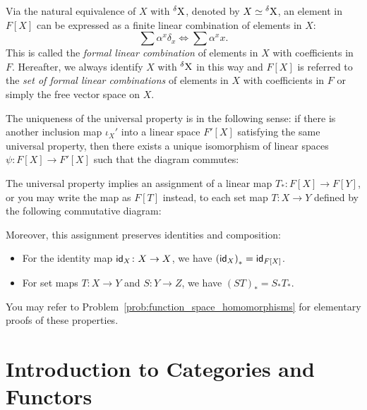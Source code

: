 Via the natural equivalence of $X$ with $\operatorname{{}^{\delta} X}$, denoted by $X \simeq \operatorname{{}^{\delta} X}$, an element in $F[X]$ can be expressed as a finite linear combination of elements in $X$:
\[
  \sum \alpha^x \delta_x \Longleftrightarrow \sum \alpha^x x.
\]
This is called the \emph{formal linear combination} of elements in $X$ with coefficients in $F$. Hereafter, we always identify $X$ with $\operatorname{{}^{\delta} X}$ in this way and $F[X]$ is referred to the \emph{set of formal linear combinations} of elements in $X$ with coefficients in $F$ or simply the free vector space on $X$.

The uniqueness of the universal property is in the following sense: if there is another inclusion map $\iota_X'$ into a linear space $F'[X]$ satisfying the same universal property, then there exists a unique isomorphism of linear spaces $\psi \colon F[X] \to F'[X]$ such that the diagram commutes:
\begin{center}
\end{center}

The universal property implies an assignment of a linear map $T_* \colon F[X] \to F[Y]$, or you may write the map as $F[T]$ instead, to each set map $T \colon X \to Y$ defined by the following commutative diagram:
\begin{center}
\end{center}
Moreover, this assignment preserves identities and composition:
\begin{itemize}
  \item For the identity map $\operatorname{\text{\normalfont\sffamily id}}_X \colon X \to X$, we have ${(\operatorname{\text{\normalfont\sffamily id}}_X)}_* = \operatorname{\text{\normalfont\sffamily id}}_{F[X]}$.
  \item For set maps $T \colon X \to Y$ and $S \colon Y \to Z$, we have ${(ST)}_* = S_* T_*$.
\end{itemize}
You may refer to Problem~\ref{prob:function_space_homomorphisms} for elementary proofs of these properties.

\section{Introduction to Categories and Functors}

